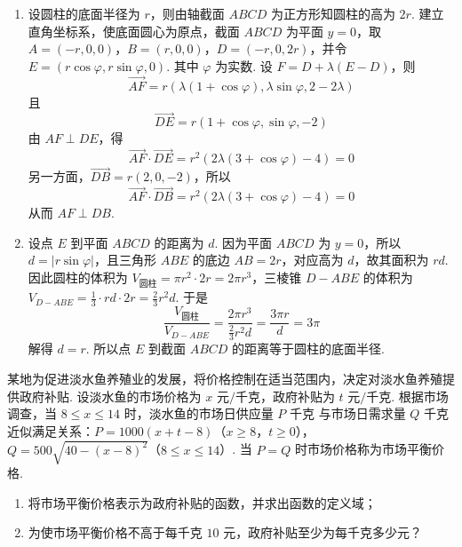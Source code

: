 \documentclass[UTF8,a4paper,oneside,11pt]{ctexbook}
\begin{document}
\begin{solution}
\begin{enumerate}
\item
设圆柱的底面半径为 \(r\)，则由轴截面 \(ABCD\) 为正方形知圆柱的高为 \(2r\). 建立直角坐标系，使底面圆心为原点，截面 \(ABCD\) 为平面 \(y=0\)，取 \(A=(-r,0,0)\)，\(B=(r,0,0)\)，\(D=(-r,0,2r)\)，并令 \(E=(r\cos\varphi,r\sin\varphi,0)\).
其中 \(\varphi\) 为实数. 设 \(F=D+\lambda(E-D)\)，则
\[
\overrightarrow{AF}=r\left(\lambda(1+\cos\varphi),\lambda\sin\varphi,2-2\lambda\right)
\]
且
\[
\overrightarrow{DE}=r(1+\cos\varphi,\sin\varphi,-2)
\]
由 \(AF\perp DE\)，得
\[
\overrightarrow{AF}\cdot\overrightarrow{DE}=r^2\left(2\lambda(3+\cos\varphi)-4\right)=0
\]
另一方面，\(\overrightarrow{DB}=r(2,0,-2)\)，所以
\[
\overrightarrow{AF}\cdot\overrightarrow{DB}=r^2\left(2\lambda(3+\cos\varphi)-4\right)=0
\]
从而 \(AF\perp DB\).

\item
设点 \(E\) 到平面 \(ABCD\) 的距离为 \(d\). 因为平面 \(ABCD\) 为 \(y=0\)，所以 \(d=|r\sin\varphi|\)，且三角形 \(ABE\) 的底边 \(AB=2r\)，对应高为 \(d\)，故其面积为 \(rd\). 因此圆柱的体积为 \(V_{\text{圆柱}}=\pi r^2\cdot2r=2\pi r^3\)，三棱锥 \(D-ABE\) 的体积为 \(V_{D-ABE}=\frac13\cdot rd\cdot2r=\frac23r^2d\).
于是
\[
\frac{V_{\text{圆柱}}}{V_{D-ABE}}=\frac{2\pi r^3}{\frac23r^2d}=\frac{3\pi r}{d}=3\pi
\]
解得 \(d=r\). 所以点 \(E\) 到截面 \(ABCD\) 的距离等于圆柱的底面半径.
\end{enumerate}
\end{solution}

\begin{problem}
某地为促进淡水鱼养殖业的发展，将价格控制在适当范围内，决定对淡水鱼养殖提供政府补贴. 设淡水鱼的市场价格为 \(x\text{ 元/千克}\)，政府补贴为 \(t\text{ 元/千克}\). 根据市场调查，当 \(8 \leqslant x \leqslant 14\) 时，淡水鱼的市场日供应量 \(P\text{ 千克}\) 与市场日需求量 \(Q\text{ 千克}\) 近似满足关系：\(P = 1000(x + t - 8)\)（\(x \geqslant 8\)，\(t \geqslant 0\)），\(Q = 500\sqrt{40 - (x - 8)^2}\)（\(8 \leqslant x \leqslant 14\)）. 当 \(P = Q\) 时市场价格称为市场平衡价格.

\begin{enumerate}
\item 将市场平衡价格表示为政府补贴的函数，并求出函数的定义域；
\item 为使市场平衡价格不高于每千克 \(10\text{ 元}\)，政府补贴至少为每千克多少元？
\end{enumerate}
\end{problem}
\end{document}
